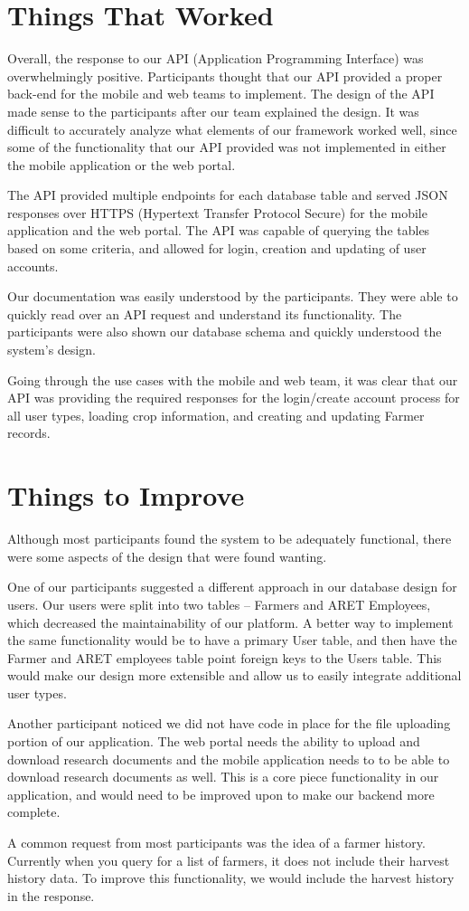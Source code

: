 \documentclass[12pt,letterpaper]{article}
\begin{document}
\section{Things That Worked}
Overall, the response to our API (Application Programming Interface) was overwhelmingly positive. Participants thought that our API provided a proper back-end for the mobile and web teams to implement. The design of the API made sense to the participants after our team explained the design. It was difficult to accurately analyze what elements of our framework worked well, since some of the functionality that our API provided was not implemented in either the mobile application or the web portal.\par
The API provided multiple endpoints for each database table and served JSON responses over HTTPS (Hypertext Transfer Protocol Secure) for the mobile application and the web portal. The API was capable of querying the tables based on some criteria, and allowed for login, creation and updating of user accounts.\par
Our documentation was easily understood by the participants. They were able to quickly read over an API request and understand its functionality. The participants were also shown our database schema and quickly understood the system's design.\par
Going through the use cases with the mobile and web team, it was clear that our API was providing the required responses for the login/create account process for all user types, loading crop information, and creating and updating Farmer records.\par

\clearpage
\section{Things to Improve}
Although most participants found the system to be adequately functional, there were some aspects of the design that were found wanting.\par
One of our participants suggested a different approach in our database design for users. Our users were split into two tables -- Farmers and ARET Employees, which decreased the maintainability of our platform. A better way to implement the same functionality would be to have a primary User table, and then have the Farmer and ARET employees table point foreign keys to the Users table. This would make our design more extensible and allow us to easily integrate additional user types.\par
Another participant noticed we did not have code in place for the file uploading portion of our application. The web portal needs the ability to upload and download research documents and the mobile application needs to to be able to download research documents as well. This is a core piece functionality in our application, and would need to be improved upon to make our backend more complete.\par
A common request from most participants was the idea of a farmer history. Currently when you query for a list of farmers, it does not include their harvest history data. To improve this functionality, we would include the harvest history in the response.\par
\end{document}
